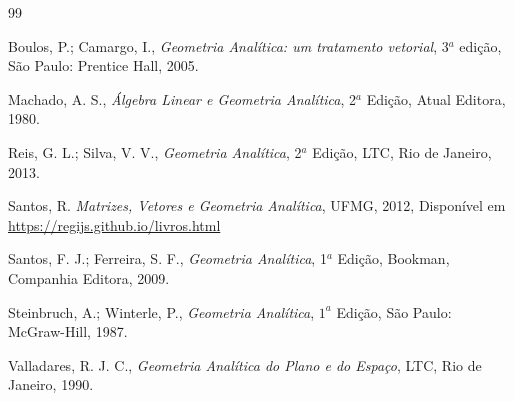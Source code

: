 \cleardoublepage
{}
{}
\renewcommand{\bibname}{Bibliografia}

\begin{thebibliography}{99}

Boulos, P.; Camargo, I., \textit{Geometria Analítica: um tratamento vetorial}, 3$^a$ edição, São Paulo: Prentice Hall, 2005.

Machado, A. S., \textit{Álgebra Linear e Geometria Analítica}, 2$^a$ Ediç{ã}o, Atual Editora, 1980.

Reis, G. L.; Silva, V. V., \textit{Geometria Analítica}, 2$^a$ Edição, LTC, Rio de Janeiro, 2013.

Santos, R. \textit{Matrizes, Vetores e Geometria Analítica}, UFMG, 2012, Disponível em \url{https://regijs.github.io/livros.html}

Santos, F. J.; Ferreira, S. F., \textit{Geometria Analítica}, 1$^{a}$ Edição, Bookman, Companhia Editora, 2009.

Steinbruch, A.; Winterle, P., \textit{Geometria Analítica}, $1^a$ Edição, São Paulo: McGraw-Hill, 1987.

Valladares, R. J. C., \textit{Geometria Analítica do Plano e do Espaço}, LTC, Rio de Janeiro, 1990.

\end{thebibliography}